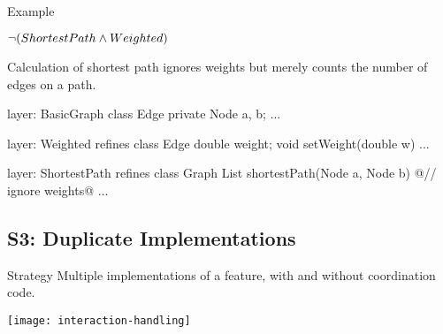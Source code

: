 \begin{frame}[fragile]{Example}
	\begin{mycolumns}[widths={50,50},animation=none]
		\begin{exampletight}{}
			\centering

			$\neg (ShortestPath \wedge Weighted)$  
		\end{exampletight}
		\vspace{3mm}
		\begin{note}{}
			Calculation of shortest path ignores weights but merely counts the number of edges on a path.
		\end{note}
	\mynextcolumn
{\small
\begin{codetight}{layer: BasicGraph}
class Edge {
	private Node a, b;
	...
}
\end{codetight}	
\begin{codetight}{layer: Weighted}
refines class Edge {
	double weight;
	void setWeight(double w){ ... }
}
\end{codetight}	
\begin{codetight}{layer: ShortestPath}
refines class Graph {
	List shortestPath(Node a, Node b){
		@// ignore weights@
		... 
	}
}
\end{codetight}	
}
	\end{mycolumns}
\end{frame}

\subsection{S3: Duplicate Implementations}

\begin{frame}{\myframetitle}
	\begin{definition}{Strategy}
		Multiple implementations of a feature, with and without coordination code.
	\end{definition}
	\begin{notetight}{}
		\centering\texttt{[image: interaction-handling]}
	\end{notetight}
\end{frame}

